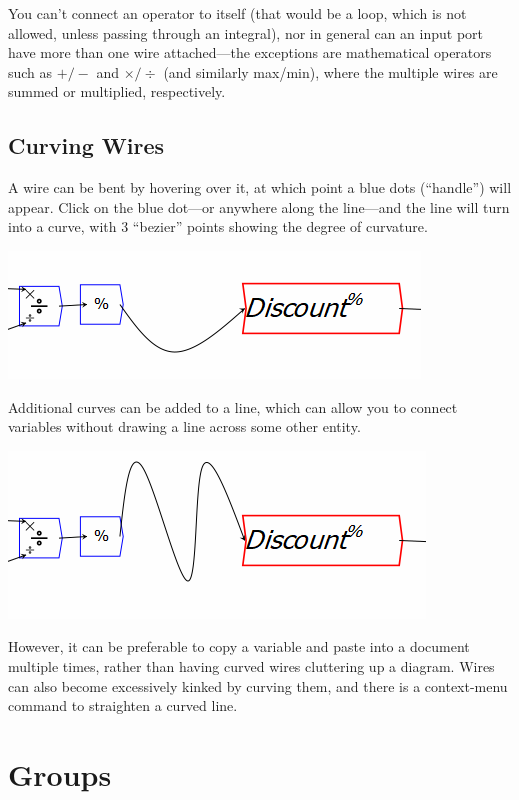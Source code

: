 You can't connect an operator to itself (that would be a loop, which
is not allowed, unless passing through an integral), nor in general
can an input port have more than one wire attached---the exceptions
are mathematical operators such as $+/-$ and $\times/\div$ (and
similarly max/min), where the multiple wires are summed or multiplied,
respectively.

\subsection{Curving Wires}

A wire can be bent by hovering over it, at which point a blue dots
(``handle'') will appear. Click on the blue dot---or anywhere along
the line---and the line will turn into a curve, with 3 ``bezier''
points showing the degree of curvature.

\includegraphics{images/CurvedLine01}

Additional curves can be added to a line, which can allow you to connect
variables without drawing a line across some other entity.

\includegraphics{images/CurvedLine02}

However, it can be preferable to copy a variable and paste into a
document multiple times, rather than having curved wires cluttering
up a diagram. Wires can also become excessively kinked by curving
them, and there is a context-menu command to straighten a curved line.

\section{Groups}

\label{Group}

